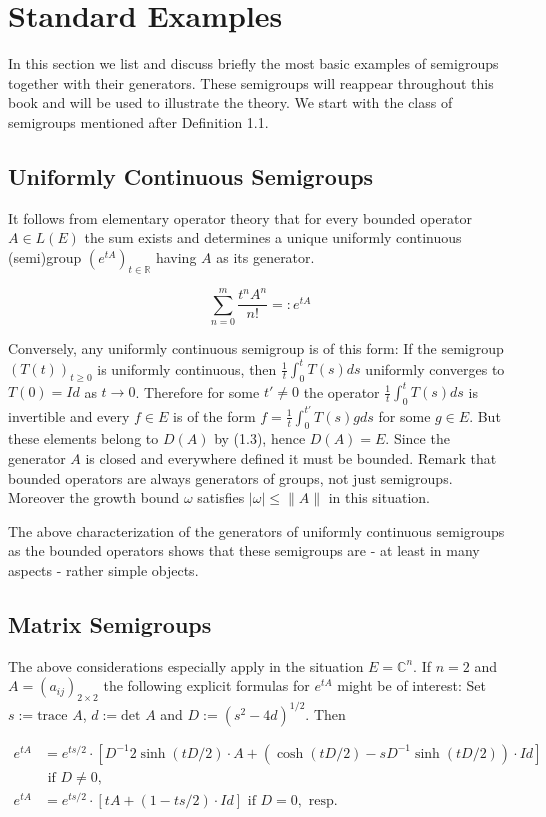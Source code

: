 \documentclass{article}
\begin{document}
\section{Standard Examples}
In this section we list and discuss briefly the most basic examples of semigroups together with their generators.
These semigroups will reappear throughout this book and will be used to illustrate the theory.
We start with the class of semigroups mentioned after Definition 1.1.

\subsection{Uniformly Continuous Semigroups}
It follows from elementary operator theory that for every bounded operator $A \in L(E)$ the sum exists and determines a unique uniformly continuous (semi)group $(e^{tA})_{t \in \mathbb{R}}$ having $A$ as its generator.

\[
\sum_{n=0}^{m} \frac{t^n A^n}{n!} =: e^{tA}
\]

Conversely, any uniformly continuous semigroup is of this form: If the semigroup $(T(t))_{t \geq 0}$ is uniformly continuous, then $\frac{1}{t} \int_{0}^{t} T(s) ds$ uniformly converges to $T(0)=Id$ as $t \rightarrow 0$.
Therefore for some $t' \neq 0$ the operator $\frac{1}{t} \int_{0}^{t} T(s) ds$ is invertible and every $f \in E$ is of the form $f=\frac{1}{t} \int_{0}^{t'} T(s) g ds$ for some $g \in E$.
But these elements belong to $D(A)$ by (1.3), hence $D(A)=E$.
Since the generator $A$ is closed and everywhere defined it must be bounded.
Remark that bounded operators are always generators of groups, not just semigroups.
Moreover the growth bound $\omega$ satisfies $|\omega| \leq \|A\|$ in this situation.

The above characterization of the generators of uniformly continuous semigroups as the bounded operators shows that these semigroups are - at least in many aspects - rather simple objects.

\subsection{Matrix Semigroups}
The above considerations especially apply in the situation $E=\mathbb{C}^n$.
If $n=2$ and $A=(a_{ij})_{2\times 2}$ the following explicit formulas for $e^{tA}$ might be of interest:
Set $s:=\text{trace }A$, $d:=\text{det }A$ and $D:=(s^2-4d)^{1/2}$.
Then

\[
\begin{aligned}
e^{tA} &= e^{ts/2} \cdot [D^{-1} 2\sinh(tD/2) \cdot A + (\cosh(tD/2)-sD^{-1}\sinh(tD/2)) \cdot Id] \\
&\text{ if } D \neq 0, \\
e^{tA} &= e^{ts/2} \cdot [tA+(1-ts/2) \cdot Id] \text{ if } D=0, \text{ resp.}
\end{aligned}
\]
\end{document}
